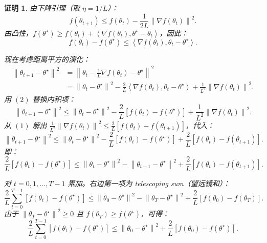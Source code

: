 \documentclass[12pt,a4paper]{ctexart}
\theoremstyle{definition}
\theoremstyle{plain}
\newtheorem*{proof*}{证明}
\newcommand{\grad}{\nabla}
\newcommand{\norm}[1]{\left\lVert #1 \right\rVert}
\newcommand{\ip}[2]{\left\langle #1,#2 \right\rangle}
\begin{document}
\begin{proof*}
  由下降引理（取 $\eta = 1/L$）：
  \begin{equation}
    f(\theta_{t+1}) \le f(\theta_t) - \frac{1}{2L} \norm{\grad f(\theta_t)}^2. \tag{1}
  \end{equation}
  由凸性，$f(\theta^\star) \ge f(\theta_t) + \ip{\grad f(\theta_t)}{\theta^\star - \theta_t}$，因此：
  \begin{equation}
    f(\theta_t) - f(\theta^\star) \le \ip{\grad f(\theta_t)}{\theta_t - \theta^\star}. \tag{2}
  \end{equation}

  现在考虑距离平方的演化：
  \begin{equation}
    \begin{aligned}
      \norm{\theta_{t+1} - \theta^\star}^2
      &= \norm{\theta_t - \frac{1}{L}\grad f(\theta_t) - \theta^\star}^2 \\
      &= \norm{\theta_t - \theta^\star}^2
        - \frac{2}{L} \ip{\grad f(\theta_t)}{\theta_t - \theta^\star}
        + \frac{1}{L^2} \norm{\grad f(\theta_t)}^2.
    \end{aligned}
  \end{equation}
  用 $(2)$ 替换内积项：
  \begin{equation}
    \norm{\theta_{t+1} - \theta^\star}^2
    \le \norm{\theta_t - \theta^\star}^2
      - \frac{2}{L}[f(\theta_t) - f(\theta^\star)]
      + \frac{1}{L^2} \norm{\grad f(\theta_t)}^2.
  \end{equation}
  从 $(1)$ 解出 $\frac{1}{L^2}\norm{\grad f(\theta_t)}^2 \le \frac{2}{L}[f(\theta_t) - f(\theta_{t+1})]$，代入：
  \begin{equation}
    \norm{\theta_{t+1} - \theta^\star}^2
    \le \norm{\theta_t - \theta^\star}^2 - \frac{2}{L}[f(\theta_t) - f(\theta^\star)]
      + \frac{2}{L}[f(\theta_t) - f(\theta_{t+1})].
  \end{equation}
  即：
  \begin{equation}
    \frac{2}{L}[f(\theta_t) - f(\theta^\star)]
    \le \norm{\theta_t - \theta^\star}^2 - \norm{\theta_{t+1} - \theta^\star}^2
      + \frac{2}{L}[f(\theta_t) - f(\theta_{t+1})].
  \end{equation}

  对 $t = 0, 1, \ldots, T-1$ 累加。右边第一项为 telescoping sum（望远镜和）：
  \begin{equation}
    \frac{2}{L} \sum_{t=0}^{T-1} [f(\theta_t) - f(\theta^\star)]
    \le \norm{\theta_0 - \theta^\star}^2 - \norm{\theta_T - \theta^\star}^2
      + \frac{2}{L}[f(\theta_0) - f(\theta_T)].
  \end{equation}
  由于 $\norm{\theta_T - \theta^\star}^2 \ge 0$ 且 $f(\theta_T) \ge f(\theta^\star)$，可得：
  \begin{equation}
    \frac{2}{L} \sum_{t=0}^{T-1} [f(\theta_t) - f(\theta^\star)]
    \le \norm{\theta_0 - \theta^\star}^2 + \frac{2}{L}[f(\theta_0) - f(\theta^\star)].
  \end{equation}


\end{proof*}
\end{document}
